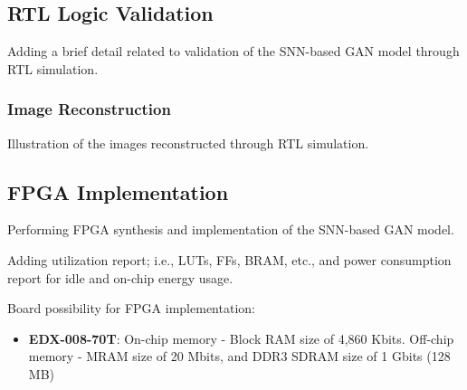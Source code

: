 \documentclass[conference]{IEEEtran}
\begin{document}
\subsection{RTL Logic Validation}

Adding a brief detail related to validation of the SNN-based GAN model through RTL simulation.

\subsubsection{Image Reconstruction}

Illustration of the images reconstructed through RTL simulation.






\subsection{FPGA Implementation}

Performing FPGA synthesis and implementation of the SNN-based GAN model.

Adding utilization report; i.e., LUTs, FFs, BRAM, etc., and power consumption report for idle and on-chip energy usage.

Board possibility for FPGA implementation:

\begin{itemize}
\item \textbf {EDX-008-70T}: On-chip memory - Block RAM size of 4,860 Kbits. Off-chip memory - MRAM size of 20 Mbits, and DDR3 SDRAM size of 1 Gbits (128 MB)
\end{itemize}
\end{document}
